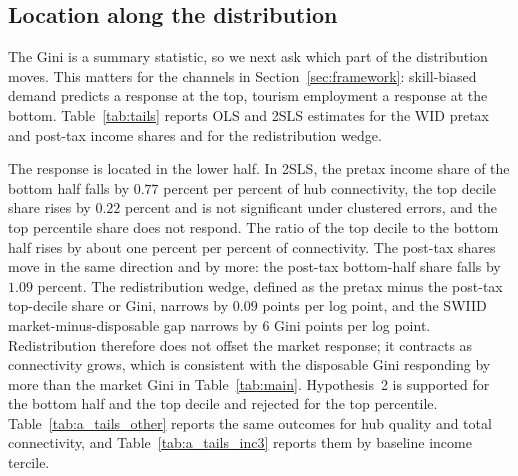 \subsection{Location along the distribution}
\label{sec:tails}
The Gini is a summary statistic, so we next ask which part of the distribution moves. This matters for the channels in Section~\ref{sec:framework}: skill-biased demand predicts a response at the top, tourism employment a response at the bottom. Table~\ref{tab:tails} reports OLS and 2SLS estimates for the WID pretax and post-tax income shares and for the redistribution wedge.

The response is located in the lower half. In 2SLS, the pretax income share of the bottom half falls by $0.77$ percent per percent of hub connectivity, the top decile share rises by $0.22$ percent and is not significant under clustered errors, and the top percentile share does not respond. The ratio of the top decile to the bottom half rises by about one percent per percent of connectivity. The post-tax shares move in the same direction and by more: the post-tax bottom-half share falls by $1.09$ percent. The redistribution wedge, defined as the pretax minus the post-tax top-decile share or Gini, narrows by $0.09$ points per log point, and the SWIID market-minus-disposable gap narrows by $6$ Gini points per log point. Redistribution therefore does not offset the market response; it contracts as connectivity grows, which is consistent with the disposable Gini responding by more than the market Gini in Table~\ref{tab:main}. Hypothesis~2 is supported for the bottom half and the top decile and rejected for the top percentile. Table~\ref{tab:a_tails_other} reports the same outcomes for hub quality and total connectivity, and Table~\ref{tab:a_tails_inc3} reports them by baseline income tercile.

